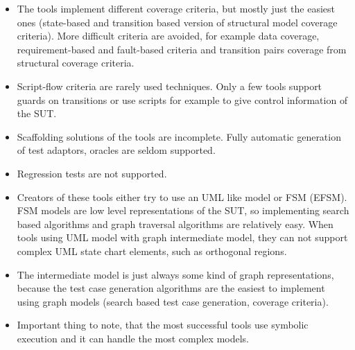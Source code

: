 \begin{itemize}
	\item The tools implement different coverage criteria, but mostly just the easiest ones (state-based and transition based version of structural model coverage criteria). More difficult criteria are avoided, for example data coverage, requirement-based and fault-based criteria and transition pairs coverage from structural coverage criteria.
	\item Script-flow criteria are rarely used techniques. Only a few tools support guards on transitions or use scripts for example to give control information of the SUT.
	\item Scaffolding solutions of the tools are incomplete. Fully automatic generation of test adaptors, oracles are seldom supported.
	\item Regression tests are not supported.
	\item Creators of these tools either try to use an UML like model or FSM (EFSM). FSM models are low level representations of the SUT, so implementing search based algorithms and graph traversal algorithms are relatively easy. When tools using UML model with graph intermediate model, they can not support complex UML state chart elements, such as orthogonal regions.
	\item The intermediate model is just always some kind of graph representations, because the test case generation algorithms are the easiest to implement using graph models (search based test case generation, coverage criteria).
	\item Important thing to note, that the most successful tools use symbolic execution and it can handle the most complex models.
\end{itemize}


